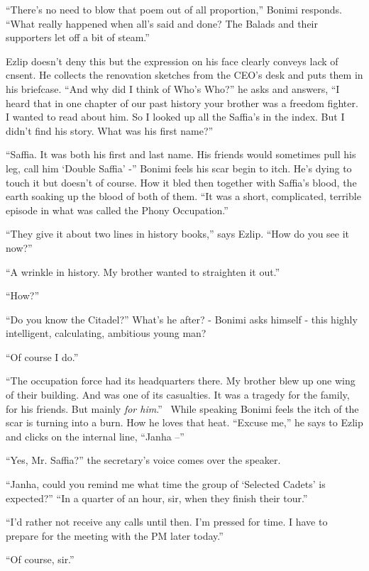 \documentclass[twoside,11pt]{book}
\begin{document}
``There's no need to blow that poem out of all proportion,'' Bonimi responds.
``What really happened when all's said and done? The Balads and their supporters let off a bit of
steam.''

Ezlip doesn't deny this but the expression on his face clearly conveys lack of cnsent. He collects the renovation
sketches from the CEO's desk and puts them in his briefcase. ``And why did I think of Who's
Who?'' he asks and answers, ``I heard that in one chapter of our past history your brother
was a freedom fighter. I wanted to read about him. So I looked up all the Saffia's in the index. But I didn't find his
story. What was his first name?''

``Saffia. It was both his first and last name. His friends would sometimes pull his leg,
%
 call him `Double Saffia' -'' Bonimi feels his scar begin to itch. He's dying to touch it but doesn't of
course. How it bled then together with Saffia's blood, the earth soaking up the blood of both of them.
``It was a short, complicated, terrible episode in what was called the Phony Occupation.''

``They give it about two lines in history books,'' says Ezlip. ``How do you see
it now?''

``A wrinkle in history. My brother wanted to straighten it out.''

``How?''

``Do you know the Citadel?'' What's he after? - Bonimi asks himself - this highly intelligent,
calculating, ambitious young man?

``Of course I do.''

``The occupation force had its headquarters there. My brother blew up one wing of their building. And was
one of its casualties. It was a tragedy for the family, for his friends. But mainly \textit{for him}.''
\ While speaking Bonimi feels the itch of the scar is turning into a burn. How he loves that heat.
``Excuse me,'' he says to Ezlip and clicks on the internal line,
``Janha --''

``Yes, Mr. Saffia?'' the secretary's voice comes over the speaker.

``Janha, could you remind me what time the group of `Selected Cadets' is
expected?'' ``In a quarter of an hour, sir, when they finish their tour.''

``I'd rather not receive any calls until then. I'm pressed for time. I have to prepare for the meeting with
the PM later today.''

``Of course, sir.''
\end{document}
